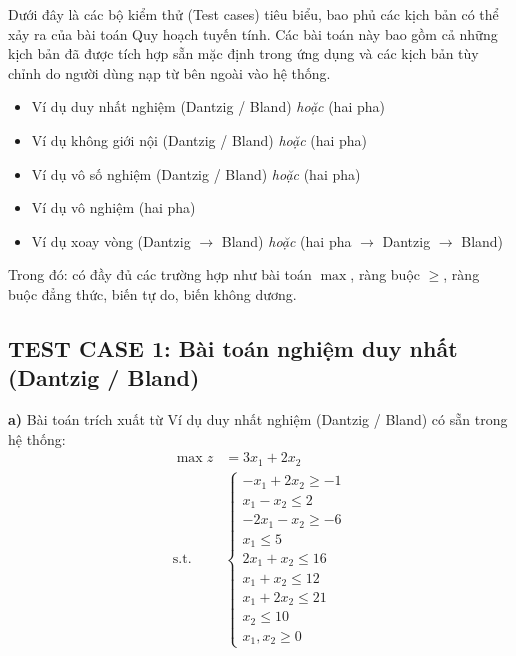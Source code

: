 \documentclass[12pt,a4paper]{article}
\begin{document}
Dưới đây là các bộ kiểm thử (Test cases) tiêu biểu, bao phủ các kịch bản có thể xảy ra của bài toán Quy hoạch tuyến tính. Các bài toán này bao gồm cả những kịch bản đã được tích hợp sẵn mặc định trong ứng dụng và các kịch bản tùy chỉnh do người dùng nạp từ bên ngoài vào hệ thống.

\begin{tcolorbox}[colback=cyan!10!white, colframe=cyan!40!black, title=\textbf{Danh mục các bài toán mẫu tích hợp trong ứng dụng}, arc=1mm]
\begin{itemize}
    \setlength{\itemsep}{2pt}
    \item Ví dụ duy nhất nghiệm (Dantzig / Bland) \textit{hoặc} (hai pha)
    \item Ví dụ không giới nội (Dantzig / Bland) \textit{hoặc} (hai pha)
    \item Ví dụ vô số nghiệm (Dantzig / Bland) \textit{hoặc} (hai pha)
    \item Ví dụ vô nghiệm (hai pha)
    \item Ví dụ xoay vòng (Dantzig $\to$ Bland) \textit{hoặc} (hai pha $\to$ Dantzig $\to$ Bland)
\end{itemize}
Trong đó: có đầy đủ các trường hợp như bài toán $\max$, ràng buộc $\geq$, ràng buộc đẳng thức, biến tự do, biến không dương.
\end{tcolorbox}

\subsection*{TEST CASE 1: Bài toán nghiệm duy nhất (Dantzig / Bland)}
\noindent \textbf{a)} Bài toán trích xuất từ \colorbox{green!30}{Ví dụ duy nhất nghiệm (Dantzig / Bland)} có sẵn trong hệ thống:
\begin{equation*}
    \begin{aligned}
        \max z &= 3x_1 + 2x_2 \\
        \text{s.t.} \quad 
        &\begin{cases}
            -x_1 + 2x_2 \geq -1 \\
            x_1 - x_2 \leq 2 \\
            -2x_1 - x_2 \geq -6 \\
            x_1 \leq 5 \\
            2x_1 + x_2 \leq 16 \\
            x_1 + x_2 \leq 12 \\
            x_1 + 2x_2 \leq 21 \\
            x_2 \leq 10\\
            x_1, x_2 \geq 0
        \end{cases}
    \end{aligned}
\end{equation*}
\end{document}
